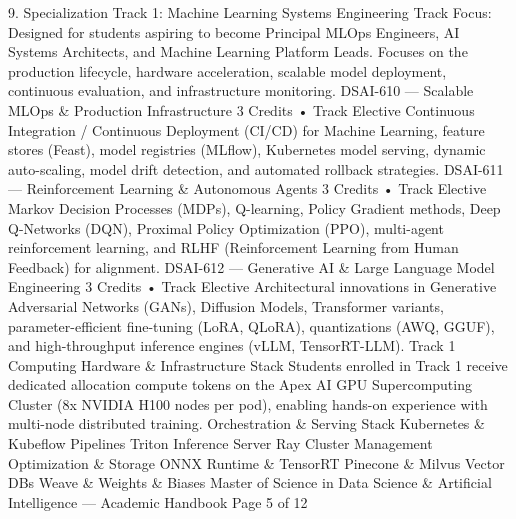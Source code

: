 9. Specialization Track 1: Machine Learning Systems Engineering
Track Focus: Designed for students aspiring to become Principal MLOps Engineers, AI Systems Architects, and
Machine Learning Platform Leads. Focuses on the production lifecycle, hardware acceleration, scalable model
deployment, continuous evaluation, and infrastructure monitoring.
DSAI-610 — Scalable MLOps \& Production Infrastructure
3 Credits • Track Elective
Continuous Integration / Continuous Deployment (CI/CD) for Machine Learning, feature stores (Feast), model
registries (MLflow), Kubernetes model serving, dynamic auto-scaling, model drift detection, and automated
rollback strategies.
DSAI-611 — Reinforcement Learning \& Autonomous Agents
3 Credits • Track Elective
Markov Decision Processes (MDPs), Q-learning, Policy Gradient methods, Deep Q-Networks (DQN), Proximal
Policy Optimization (PPO), multi-agent reinforcement learning, and RLHF (Reinforcement Learning from Human
Feedback) for alignment.
DSAI-612 — Generative AI \& Large Language Model Engineering
3 Credits • Track Elective
Architectural innovations in Generative Adversarial Networks (GANs), Diffusion Models, Transformer variants,
parameter-efficient fine-tuning (LoRA, QLoRA), quantizations (AWQ, GGUF), and high-throughput inference
engines (vLLM, TensorRT-LLM).
Track 1 Computing Hardware \& Infrastructure Stack
Students enrolled in Track 1 receive dedicated allocation compute tokens on the Apex AI GPU Supercomputing
Cluster (8x NVIDIA H100 nodes per pod), enabling hands-on experience with multi-node distributed training.
Orchestration \& Serving Stack
Kubernetes \& Kubeflow Pipelines
Triton Inference Server
Ray Cluster Management
Optimization \& Storage
ONNX Runtime \& TensorRT
Pinecone \& Milvus Vector DBs
Weave \& Weights \& Biases
Master of Science in Data Science \& Artificial Intelligence — Academic Handbook
Page 5 of 12

